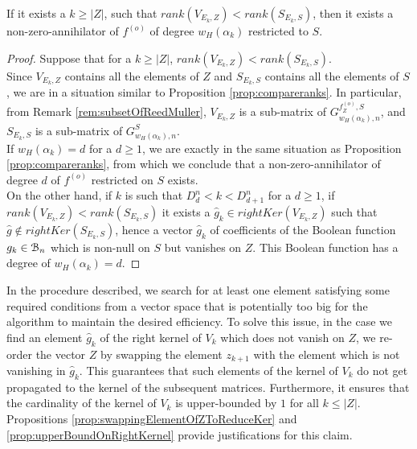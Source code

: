 \documentclass[11pt]{llncs}
\begin{document}
\begin{proposition}\label{prop:comparsonVandSAfterAllelementsofZ}
    If it exists a $k \geq |Z|$, such that $rank\left(V_{E_k, Z}\right) < rank\left(S_{E_k,S}\right)$, then it exists a non-zero-annihilator of $f^{(o)}$ of degree $w_H\left(\alpha_k\right)$ restricted to $S$.
\end{proposition}
\begin{proof}
    Suppose that for a $k \geq |Z|$, $rank\left(V_{E_k, Z}\right) < rank\left(S_{E_k, S}\right)$.\\
    Since $V_{E_k, Z}$ contains all the elements of $Z$ and $S_{E_k, S}$ contains all the elements of $S$, we are in a situation similar to Proposition \ref{prop:compareranks}. In particular, from Remark \ref{rem:subsetOfReedMuller}, $V_{E_k,Z}$ is a sub-matrix of $G_{w_H\left(\alpha_k\right), n}^{f_Z^{(o)}, S}$, and $S_{E_k,S}$ is a sub-matrix of $G_{w_H\left(\alpha_k\right), n}^{S}$.\\
    If $w_H\left(\alpha_k\right) = d$ for a $d\geq 1$, we are exactly in the same situation as Proposition \ref{prop:compareranks}, from which we conclude that a non-zero-annihilator of degree $d$ of $f^{(o)}$ restricted on $S$ exists.\\
    On the other hand, if $k$ is such that $D_{d}^n < k < D_{d+1}^n$ for a $d \geq 1$, if $rank\left(V_{E_k,Z}\right) < rank\left(S_{E_k,S}\right)$ it exists a $\hat{g}_k \in rightKer\left(V_{E_k,Z}\right)$ such that $\hat{g} \not\in rightKer\left(S_{E_k, S}\right)$, hence a vector $\hat{g}_k$ of coefficients of the Boolean function $g_k \in \mathcal{B}_{n}$ which is non-null on $S$ but vanishes on $Z$. This Boolean function has a degree of $w_H\left(\alpha_k\right) = d$.
\end{proof}


\begin{remark}
    In the procedure described, we search for at least one element satisfying some required conditions from a vector space that is potentially too big for the algorithm to maintain the desired efficiency. To solve this issue, in the case we find an element $\hat{g}_k$ of the right kernel of $V_k$ which does not vanish on $Z$, we re-order the vector $Z$ by swapping the element $z_{k+1}$ with the element which is not vanishing in $\hat{g}_k$. This guarantees that such elements of the kernel of $V_k$ do not get propagated to the kernel of the subsequent matrices. Furthermore, it ensures that the cardinality of the kernel of $V_k$ is upper-bounded by $1$ for all $k \leq |Z|$.\\
    Propositions \ref{prop:swappingElementOfZToReduceKer} and \ref{prop:upperBoundOnRightKernel} provide justifications for this claim.
\end{remark}
\end{document}
